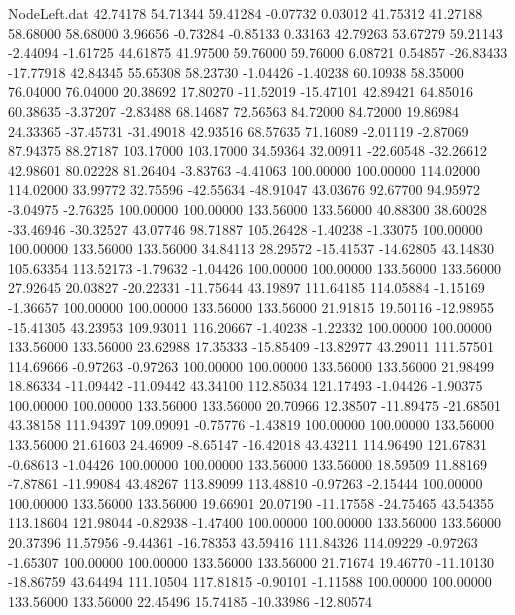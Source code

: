 \begin{filecontents}{NodeLeft.dat}
  42.74178   54.71344   59.41284    -0.07732    0.03012   41.75312   41.27188   58.68000   58.68000    3.96656   -0.73284   -0.85133    0.33163
  42.79263   53.67279   59.21143    -2.44094   -1.61725   44.61875   41.97500   59.76000   59.76000    6.08721    0.54857  -26.83433  -17.77918
  42.84345   55.65308   58.23730    -1.04426   -1.40238   60.10938   58.35000   76.04000   76.04000   20.38692   17.80270  -11.52019  -15.47101
  42.89421   64.85016   60.38635    -3.37207   -2.83488   68.14687   72.56563   84.72000   84.72000   19.86984   24.33365  -37.45731  -31.49018
  42.93516   68.57635   71.16089    -2.01119   -2.87069   87.94375   88.27187  103.17000  103.17000   34.59364   32.00911  -22.60548  -32.26612
  42.98601   80.02228   81.26404    -3.83763   -4.41063  100.00000  100.00000  114.02000  114.02000   33.99772   32.75596  -42.55634  -48.91047
  43.03676   92.67700   94.95972    -3.04975   -2.76325  100.00000  100.00000  133.56000  133.56000   40.88300   38.60028  -33.46946  -30.32527
  43.07746   98.71887  105.26428    -1.40238   -1.33075  100.00000  100.00000  133.56000  133.56000   34.84113   28.29572  -15.41537  -14.62805
  43.14830  105.63354  113.52173    -1.79632   -1.04426  100.00000  100.00000  133.56000  133.56000   27.92645   20.03827  -20.22331  -11.75644
  43.19897  111.64185  114.05884    -1.15169   -1.36657  100.00000  100.00000  133.56000  133.56000   21.91815   19.50116  -12.98955  -15.41305
  43.23953  109.93011  116.20667    -1.40238   -1.22332  100.00000  100.00000  133.56000  133.56000   23.62988   17.35333  -15.85409  -13.82977
  43.29011  111.57501  114.69666    -0.97263   -0.97263  100.00000  100.00000  133.56000  133.56000   21.98499   18.86334  -11.09442  -11.09442
  43.34100  112.85034  121.17493    -1.04426   -1.90375  100.00000  100.00000  133.56000  133.56000   20.70966   12.38507  -11.89475  -21.68501
  43.38158  111.94397  109.09091    -0.75776   -1.43819  100.00000  100.00000  133.56000  133.56000   21.61603   24.46909   -8.65147  -16.42018
  43.43211  114.96490  121.67831    -0.68613   -1.04426  100.00000  100.00000  133.56000  133.56000   18.59509   11.88169   -7.87861  -11.99084
  43.48267  113.89099  113.48810    -0.97263   -2.15444  100.00000  100.00000  133.56000  133.56000   19.66901   20.07190  -11.17558  -24.75465
  43.54355  113.18604  121.98044    -0.82938   -1.47400  100.00000  100.00000  133.56000  133.56000   20.37396   11.57956   -9.44361  -16.78353
  43.59416  111.84326  114.09229    -0.97263   -1.65307  100.00000  100.00000  133.56000  133.56000   21.71674   19.46770  -11.10130  -18.86759
  43.64494  111.10504  117.81815    -0.90101   -1.11588  100.00000  100.00000  133.56000  133.56000   22.45496   15.74185  -10.33986  -12.80574

\end{filecontents}
